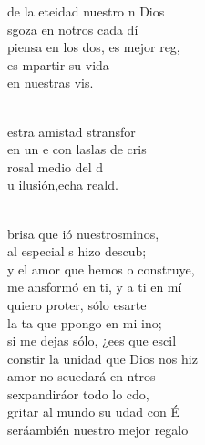 \begin{cancion}%
	de la eteidad nuestro n Dios\\
	sgoza en notros cada dí\\
	piensa en los dos, es  mejor reg,\\
	es mpartir su vida \\
	en nuestras vis.\\\jump\\
	\begin{chorus}%
	estra amistad stransfor \\
	en un e con laslas de cris \\
	 rosal  medio del d \\
	u ilusión,echa reald.\\
	\end{chorus}%
	\jump\\
	brisa que ió nuestrosminos,\\
	al especial s hizo descub;\\
	y el amor que hemos o construye,\\
	me ansformó en ti, y a ti en mí\\
	quiero proter, sólo esarte\\
	la ta que ppongo en mi ino;\\
	si me dejas sólo, ¿ees que escil \\
	constir la unidad que Dios nos hiz\\
	amor no seuedará en ntros\\
	sexpandiráor todo lo cdo,\\
	gritar al mundo su udad con É\\
	seráambién nuestro mejor regalo\\
\end{cancion}%

